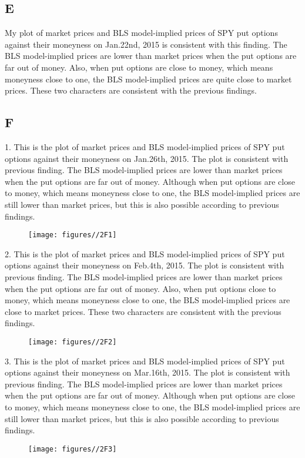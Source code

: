 \documentclass{report}
\begin{document}
\subsection{E}
My plot of market prices and BLS model-implied prices of SPY put options against their moneyness on Jan.22nd, 2015 is consistent with this finding. The BLS model-implied prices are lower than market prices when the put options are far out of money. Also, when put options are close to money, which means moneyness close to one, the BLS model-implied prices are quite close to market prices. These two characters are consistent with the previous findings.

\subsection{F}
1. This is the plot of market prices and BLS model-implied prices of SPY put options against their moneyness on Jan.26th, 2015. The plot is consistent with previous finding. The BLS model-implied prices are lower than market prices when the put options are far out of money. Although when put options are close to money, which means moneyness close to one, the BLS model-implied prices are still lower than market prices, but this is also possible according to previous findings.
\begin{figure}[H]
        \centering 
         \texttt{[image: figures//2F1]}
\end{figure}

2. This is the plot of market prices and BLS model-implied prices of SPY put options against their moneyness on Feb.4th, 2015. The plot is consistent with previous finding. The BLS model-implied prices are lower than market prices when the put options are far out of money. Also, when put options close to money, which means moneyness close to one, the BLS model-implied prices are close to market prices. These two characters are consistent with the previous findings.
\begin{figure}[H]
        \centering 
         \texttt{[image: figures//2F2]}
\end{figure}

3. This is the plot of market prices and BLS model-implied prices of SPY put options against their moneyness on Mar.16th, 2015. The plot is consistent with previous finding. The BLS model-implied prices are lower than market prices when the put options are far out of money. Although when put options are close to money, which means moneyness close to one, the BLS model-implied prices are still lower than market prices, but this is also possible according to previous findings.
\begin{figure}[H]
        \centering 
         \texttt{[image: figures//2F3]}
\end{figure}
\end{document}
